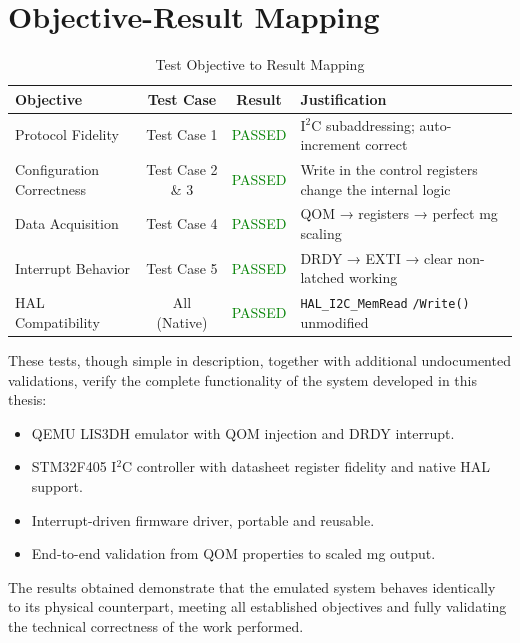 \section{Objective-Result Mapping}

\begin{table}[H]
    \centering
    \small
    \caption{Test Objective to Result Mapping}
    \label{tab:test_objective_mapping}
    \begin{tabularx}{\textwidth}{|X|c|c|X|}
        \hline
        \textbf{Objective} & \textbf{Test Case} & \textbf{Result} & \textbf{Justification} \\
        \hline
        Protocol Fidelity & Test Case 1 & \textcolor{green}{PASSED} & 
        I$^2$C subaddressing;  auto-increment correct \\
        \hline
        Configuration Correctness & Test Case 2 \& 3 & \textcolor{green}{PASSED} & 
        Write in the control registers change the internal logic \\
        \hline
        Data Acquisition & Test Case 4 & \textcolor{green}{PASSED} & 
        QOM → registers → perfect mg scaling \\
        \hline
        Interrupt Behavior & Test Case 5 & \textcolor{green}{PASSED} & 
        DRDY → EXTI → clear non-latched working \\
        \hline
        HAL Compatibility & All (Native) & \textcolor{green}{PASSED} & 
        \texttt{HAL\_I2C\_MemRead} \texttt{/Write()} unmodified \\
        \hline
    \end{tabularx}
\end{table}

These tests, though simple in description, together with additional undocumented 
validations, verify the complete functionality of the system developed in this thesis:

\begin{itemize}
  \item QEMU LIS3DH emulator with QOM injection and 
  DRDY interrupt.
  \item STM32F405 I$^2$C controller with datasheet 
  register fidelity and native HAL support.
  \item Interrupt-driven firmware driver, portable 
  and reusable.
  \item End-to-end validation from QOM properties 
  to scaled mg output.
\end{itemize}

The results obtained demonstrate that the emulated system 
behaves identically to its physical counterpart, meeting all established objectives 
and fully validating the technical correctness of the work performed.
